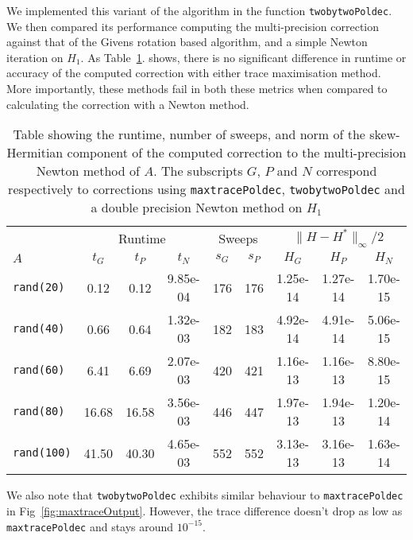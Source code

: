 \documentclass[10pt, A4paper]{article}
\begin{document}
We implemented this variant of the algorithm in the function
\texttt{twobytwoPoldec}.
We then compared its performance computing the multi-precision
correction against that of the Givens rotation based algorithm, and a
simple Newton iteration on $H_1$.
As Table~\ref{tab:GivPolNewComp}. shows, there is no significant
difference in runtime or accuracy of the computed correction with
either trace maximisation method.
More importantly, these methods fail in both these metrics when
compared to calculating the correction with a Newton method.
\begin{table}[t]
    \centering
    \begin{adjustbox}{center}
    \begin{tabular}{lcccccccc}
		\toprule
	 & \multicolumn{3}{c}{Runtime} & \multicolumn{2}{c}{Sweeps}&
	\multicolumn{3}{c}{$\|H - H^*\|_\infty / 2$}\\
	\cmidrule(lr){2-4} \cmidrule(lr){5-6} \cmidrule(lr){7-9}
    $A$ & $t_G$ & $t_P$ & $t_N$ & $s_G$ & $s_P$ & $H_G$ &
    $H_P$ & $H_N$ \\
		\midrule
\texttt{rand(20)}  & 0.12      & 0.12      & 9.85e-04  & 176       & 176       & 1.25e-14         & 1.27e-14         & 1.70e-15         \\
\texttt{rand(40)}  & 0.66      & 0.64      & 1.32e-03  & 182       & 183       & 4.92e-14         & 4.91e-14         & 5.06e-15         \\
\texttt{rand(60)}  & 6.41      & 6.69      & 2.07e-03  & 420       & 421       & 1.16e-13         & 1.16e-13         & 8.80e-15         \\
\texttt{rand(80)}  & 16.68     & 16.58     & 3.56e-03  & 446       & 447       & 1.97e-13         & 1.94e-13         & 1.20e-14         \\
\texttt{rand(100)} & 41.50     & 40.30     & 4.65e-03  & 552       & 552       & 3.13e-13         & 3.16e-13         & 1.63e-14         \\
  	\bottomrule
    \end{tabular}
	\end{adjustbox}
    \caption{\label{tab:GivPolNewComp}
    	Table showing the runtime, number of sweeps, and norm of the
    	skew-Hermitian component of the computed correction to the
    	multi-precision Newton method of $A$.
    	The subscripts $G$, $P$ and $N$ correspond respectively to
    	corrections using \texttt{maxtracePoldec},
    	\texttt{twobytwoPoldec} and a double precision Newton method on
		$H_1$
	}
\end{table}
We also note that \texttt{twobytwoPoldec} exhibits similar behaviour to
\texttt{maxtracePoldec} in Fig~\ref{fig:maxtraceOutput}.
However, the trace difference doesn't drop as low as
\texttt{maxtracePoldec} and stays around $10^{-15}$.
\end{document}
